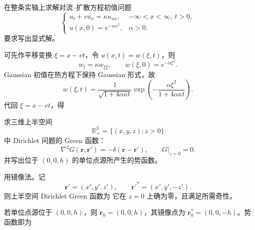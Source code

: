 ﻿


\begin{question}
在整条实轴上求解对流--扩散方程初值问题
\[
\begin{cases}
 u_t+v u_x=\kappa u_{xx}, & -\infty<x<\infty,\ t>0,\\
 u(x,0)=e^{-\alpha x^2}, & \alpha>0.
\end{cases}
\]
要求写出显式解。
\begin{solution}

可先作平移变换 $\xi=x-vt$，令 $u(x,t)=w(\xi,t)$，则
\[
 w_t=\kappa w_{\xi\xi},
 \qquad w(\xi,0)=e^{-\alpha \xi^2}.
\]
Gaussian 初值在热方程下保持 Gaussian 形式，故
\[
 w(\xi,t)=\frac{1}{\sqrt{1+4\alpha\kappa t}}
 \exp\left(-\frac{\alpha \xi^2}{1+4\alpha\kappa t}\right).
\]
代回 $\xi=x-vt$，得
\end{solution}
\end{question}

\begin{question}
求三维上半空间
\[
\mathbb R_+^3=\{(x,y,z):z>0\}
\]
中 Dirichlet 问题的 Green 函数：
\[
\nabla^2 G(\mathbf r,\mathbf r')=-\delta(\mathbf r-\mathbf r'),
\qquad G|_{z=0}=0.
\]
并写出位于 $(0,0,h)$ 的单位点源所产生的势函数。
\begin{solution}

用镜像法。记
\[
\mathbf r'=(x',y',z'),
\qquad
\mathbf r'^*=(x',y',-z').
\]
则上半空间 Dirichlet Green 函数为
它在 $z=0$ 上确为零，且满足所需奇性。

若单位点源位于 $(0,0,h)$，则 $\mathbf r_0=(0,0,h)$，其镜像点为 $\mathbf r_0^*=(0,0,-h)$。势函数即为
\end{solution}
\end{question}

